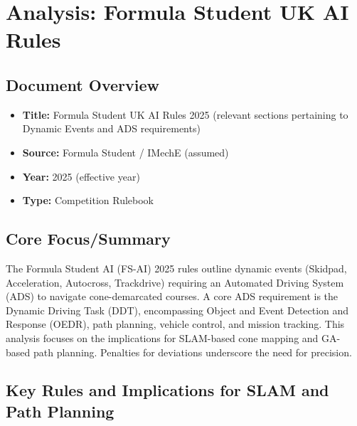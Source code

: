 \section{Analysis: Formula Student UK AI Rules}\label{sec:fs-uk-ai-rules-2025}

\subsection{Document Overview}\label{subsec:document-overview}
\begin{itemize}
    \item \textbf{Title:} Formula Student UK AI Rules 2025 (relevant sections pertaining to Dynamic Events and ADS requirements)
    \item \textbf{Source:} Formula Student / IMechE (assumed)
    \item \textbf{Year:} 2025 (effective year)
    \item \textbf{Type:} Competition Rulebook
\end{itemize}

\subsection{Core Focus/Summary}\label{subsec:core-focus/summary}
The Formula Student AI (FS-AI) 2025 rules outline dynamic events (Skidpad, Acceleration, Autocross, Trackdrive) requiring an Automated Driving System (ADS) to navigate cone-demarcated courses.
A core ADS requirement is the Dynamic Driving Task (DDT), encompassing Object and Event Detection and Response (OEDR), path planning, vehicle control, and mission tracking.
This analysis focuses on the implications for SLAM-based cone mapping and GA-based path planning.
Penalties for deviations underscore the need for precision.

\subsection{Key Rules and Implications for SLAM and Path Planning}\label{subsec:key-rules-and-implications-for-slam-and-path-planning}

